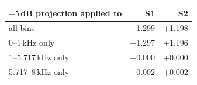 \begin{tabular}{@{}lrr@{}}
\toprule
$-5$\,dB projection applied to & S1 & S2 \\
\midrule
all bins & +1.299 & +1.198 \\
0--1\,kHz only & +1.297 & +1.196 \\
1--5.717\,kHz only & +0.000 & +0.000 \\
5.717--8\,kHz only & +0.002 & +0.002 \\
\bottomrule
\end{tabular}
